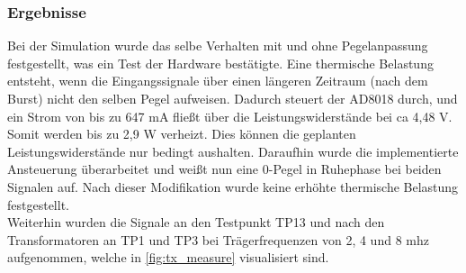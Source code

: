 \subsubsection*{Ergebnisse}
Bei der Simulation wurde das selbe Verhalten mit und ohne Pegelanpassung festgestellt, was ein Test der Hardware bestätigte. Eine thermische Belastung entsteht, wenn die Eingangssignale über einen längeren Zeitraum (nach dem Burst) nicht den selben Pegel aufweisen. Dadurch steuert der AD8018 durch, und ein Strom von bis zu 647 mA fließt über die Leistungswiderstände bei \ac{ca} 4,48 V. Somit werden bis zu 2,9 W verheizt. Dies können die geplanten  Leistungswiderstände nur bedingt aushalten. Daraufhin wurde die implementierte Ansteuerung überarbeitet und weißt nun eine 0-Pegel in Ruhephase bei beiden Signalen auf. Nach dieser Modifikation wurde keine erhöhte thermische Belastung festgestellt.\\
Weiterhin wurden die Signale an den Testpunkt TP13 und nach den Transformatoren an TP1 und TP3 bei Trägerfrequenzen von 2, 4 und 8 \ac{mhz} aufgenommen, welche in \autoref{fig:tx_measure} visualisiert sind.
